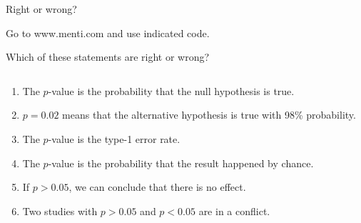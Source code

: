 \documentclass[
  10pt,
  ignorenonframetext,
]{beamer}
\providecommand{\tightlist}{%
  \setlength{\itemsep}{0pt}\setlength{\parskip}{0pt}}
\begin{document}
\begin{frame}
\begin{block}{Right or wrong?}
\protect\hypertarget{right-or-wrong}{}
\(~\)

Go to www.menti.com and use indicated code.

Which of these statements are right or wrong?

\(~\)

\begin{enumerate}
\tightlist
\item
  The \(p\)-value is the probability that the null hypothesis is true.
\end{enumerate}

\vspace{2mm}

\begin{enumerate}
\setcounter{enumi}{1}
\tightlist
\item
  \(p=0.02\) means that the alternative hypothesis is true with 98\%
  probability.
\end{enumerate}

\vspace{2mm}

\begin{enumerate}
\setcounter{enumi}{2}
\tightlist
\item
  The \(p\)-value is the type-1 error rate.
\end{enumerate}

\vspace{2mm}

\begin{enumerate}
\setcounter{enumi}{3}
\tightlist
\item
  The \(p\)-value is the probability that the result happened by chance.
\end{enumerate}

\vspace{2mm}

\begin{enumerate}
\setcounter{enumi}{4}
\tightlist
\item
  If \(p>0.05\), we can conclude that there is no effect.
\end{enumerate}

\vspace{2mm}

\begin{enumerate}
\setcounter{enumi}{5}
\tightlist
\item
  Two studies with \(p>0.05\) and \(p<0.05\) are in a conflict.
\end{enumerate}

\vspace{7mm}
\end{block}
\end{frame}
\end{document}
